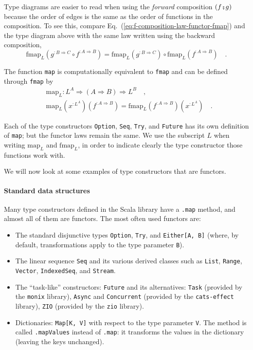 Type diagrams are easier to read when using the \emph{forward} composition
$\left(f\bef g\right)$ because the order of edges is the same as
the order of functions in the composition. To see this, compare Eq.~(\ref{eq:f-composition-law-functor-fmap})
and the type diagram above with the same law written using the backward
composition,
\[
\text{fmap}_{L}(g^{:B\Rightarrow C}\circ f^{:A\Rightarrow B})=\text{fmap}_{L}(g^{:B\Rightarrow C})\circ\text{fmap}_{L}(f^{:A\Rightarrow B})\quad.
\]

The function \lstinline!map! is computationally equivalent to \lstinline!fmap!
and can be defined through \lstinline!fmap! by
\begin{align*}
 & \text{map}_{L}:L^{A}\Rightarrow\left(A\Rightarrow B\right)\Rightarrow L^{B}\quad,\\
 & \text{map}_{L}(x^{:L^{A}})(f^{:A\Rightarrow B})=\text{fmap}_{L}(f^{:A\Rightarrow B})(x^{:L^{A}})\quad.
\end{align*}

Each of the type constructors \lstinline!Option!, \lstinline!Seq!,
\lstinline!Try!, and \lstinline!Future! has its own definition of
\lstinline!map!; but the functor laws remain the same. We use the
subscript $L$ when writing $\text{map}_{L}$ and $\text{fmap}_{L}$,
in order to indicate clearly the type constructor those functions
work with.

We will now look at some examples of type constructors that are functors.

\paragraph{Standard data structures}

Many type constructors defined in the Scala library have a \lstinline!.map!
method, and almost all of them are functors. The most often used functors
are:
\begin{itemize}
\item The standard disjunctive types \lstinline!Option!, \lstinline!Try!,
and \lstinline!Either[A, B]! (where, by default, transformations
apply to the type parameter \lstinline!B!).
\item The linear sequence \lstinline!Seq! and its various derived classes
such as \lstinline!List!, \lstinline!Range!, \lstinline!Vector!,
\lstinline!IndexedSeq!, and \lstinline!Stream!.
\item The ``task-like'' constructors: \lstinline!Future! and its alternatives:
\lstinline!Task! (provided by the \texttt{monix} library), \lstinline!Async!
and \lstinline!Concurrent! (provided by the \texttt{cats-effect}
library), \lstinline!ZIO! (provided by the \texttt{zio} library).
\item Dictionaries: \lstinline!Map[K, V]! with respect to the type parameter
\lstinline!V!. The method is called \lstinline!.mapValues! instead
of \lstinline!.map!: it transforms the values in the dictionary (leaving
the keys unchanged).
\end{itemize}

